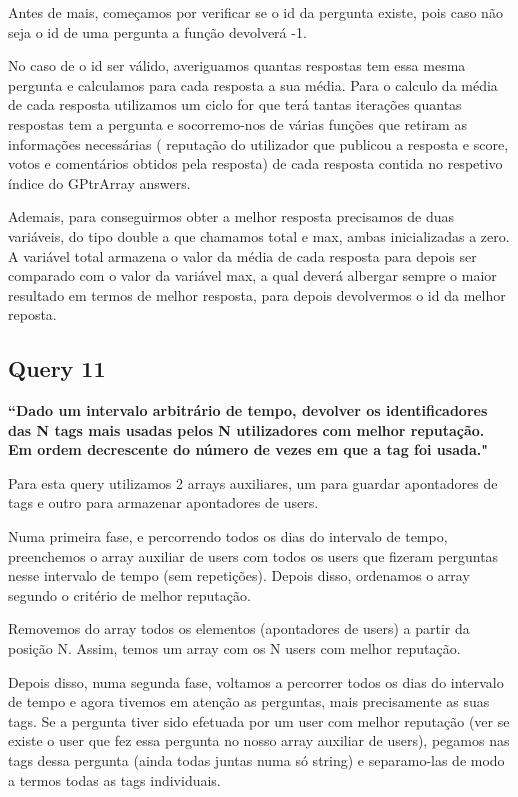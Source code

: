 \documentclass[a4paper]{report}
\begin{document}
Antes de mais, começamos por verificar se o id da pergunta existe, pois caso não
seja o id de uma pergunta a função devolverá -1. \par
No caso de o id ser válido, averiguamos quantas respostas tem essa mesma pergunta
e calculamos para cada resposta a sua média. Para o calculo da média de cada resposta
utilizamos um ciclo for que terá tantas iterações quantas respostas tem a pergunta e
socorremo-nos de várias funções que retiram as informações necessárias ( reputação
do utilizador que publicou a resposta e score, votos e comentários obtidos pela resposta)
de cada resposta contida no respetivo índice do GPtrArray answers. \par
Ademais, para conseguirmos obter a melhor resposta precisamos de duas variáveis,
do tipo double a que chamamos total e max, ambas inicializadas a zero. A variável total
armazena o valor da média de cada resposta para depois ser comparado com o valor da variável
max, a qual deverá albergar sempre o maior resultado em termos de melhor resposta, para
depois devolvermos o id da melhor reposta.



\subsection*{Query 11}
\label{sec:query11}

\textbf{“Dado um intervalo arbitrário de tempo, devolver os identificadores das N tags
mais usadas pelos N utilizadores com melhor reputação. Em ordem decrescente do número
de vezes em que a tag foi usada."}

Para esta query utilizamos 2 arrays auxiliares, um para guardar apontadores de tags
e outro para armazenar apontadores de users.

Numa primeira fase, e percorrendo todos os dias do intervalo de tempo,
preenchemos o array auxiliar de users com todos os users que fizeram perguntas
nesse intervalo de tempo (sem repetições). Depois disso, ordenamos o array segundo
o critério de melhor reputação.

Removemos do array todos os elementos (apontadores de users) a partir da posição N.
Assim, temos um array com os N users com melhor reputação.

Depois disso, numa segunda fase, voltamos a percorrer todos os dias do intervalo
de tempo e agora tivemos em atenção as perguntas, mais precisamente as suas tags.
Se a pergunta tiver sido efetuada por um user com melhor reputação (ver se existe
o user que fez essa pergunta no nosso array auxiliar de users), pegamos nas tags
dessa pergunta (ainda todas juntas numa só string) e separamo-las de modo a termos
todas as tags individuais.
\end{document}
